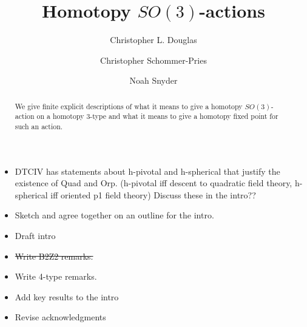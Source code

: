 \documentclass{amsart}
\begin{document}
\title{Homotopy $SO(3)$-actions}

\author{Christopher L. Douglas}
\address{Mathematical Institute\\ University of Oxford\\ Oxford OX1 3LB\\ United Kingdom}
      	
\author{Christopher Schommer-Pries}
\address{Department of Mathematics\\ University of Notre Dame \\ Notre Dame, IN 46556\\ USA}

\author{Noah Snyder}
\address{Department of Mathematics\\ Indiana University\\ Bloomington, IN 47405\\ USA}


\begin{abstract}
We give finite explicit descriptions of what it means to give a homotopy $SO(3)$-action on a homotopy $3$-type and what it means to give a homotopy fixed point for such an action.
\end{abstract}

\maketitle

\tikzexternaldisable

\tableofcontents



\begin{itemize}
\item DTCIV has statements about h-pivotal and h-spherical that justify the existence of Quad and Orp. (h-pivotal iff descent to quadratic field theory, h-spherical iff oriented p1 field theory) Discuss these in the intro??
\item Sketch and agree together on an outline for the intro.
\item Draft intro
\end{itemize}

\begin{itemize}
\item \sout{Write B2Z2 remarks.}
\item Write 4-type remarks.
\item Add key results to the intro
\item Revise acknowledgments
\end{itemize}
\end{document}

